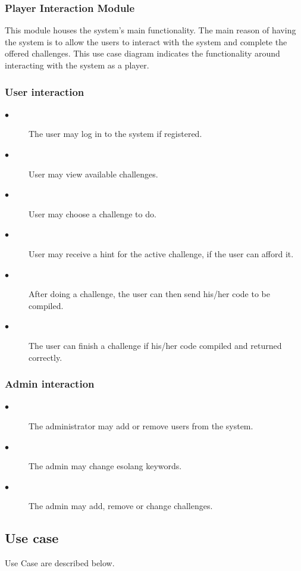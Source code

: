 \documentclass[english]{article}
\begin{document}
		\subsubsection{Player Interaction Module}
		This module houses the system's main functionality. The main reason of having the system is to allow the users to interact with the system and complete the offered challenges. This use case diagram indicates the functionality around interacting with the system as a player.
		
	\iffalse	
		\subsubsection{User interaction}
		\begin{description}
			\item[$\bullet$] The user may log in to the system if registered.
			\item[$\bullet$] User may view available challenges.
			\item[$\bullet$] User may choose a challenge to do.
			\item[$\bullet$] User may receive a hint for the active challenge, if the user can afford it.
			\item[$\bullet$] After doing a challenge, the user can then send his/her code to be compiled.
			\item[$\bullet$] The user can finish a challenge if his/her code compiled and returned correctly.
		\end{description}
		
		\subsubsection{Admin interaction}
		\begin{description}
			\item[$\bullet$] The administrator may add or remove users from the system.
			\item[$\bullet$] The admin may change esolang keywords.
			\item[$\bullet$] The admin may add, remove or change challenges.
		\end{description}

		
		\subsection{Use case}
		Use Case are described below.
		
		
		
\end{document}
